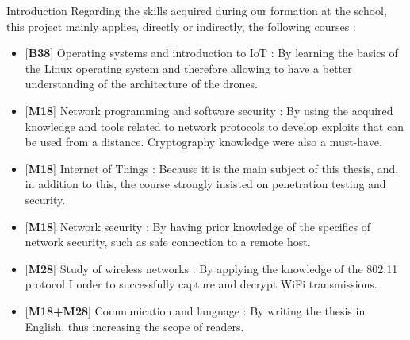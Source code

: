 \begin{chaptercover}{Introduction}
Regarding the skills acquired during our formation at the school, this project mainly applies, directly or indirectly, the following courses :
\begin{itemize}[itemsep=0.1cm,topsep=0.1cm]
  \hyphenation{}
  \item{} [{\color{FirstBlue}\bfseries B38}] Operating systems and introduction to IoT : By learning the basics of the Linux operating system and therefore allowing to have a better understanding of the architecture of the drones.
  \item{} [{\color{FirstBlue}\bfseries M18}] Network programming and software security : By using the acquired knowledge and tools related to network protocols to develop exploits that can be used from a distance. Cryptography knowledge were also a must-have.
  \item{} [{\color{FirstBlue}\bfseries M18}]  Internet of Things : Because it is the main subject of this thesis, and, in addition to this, the course strongly insisted on penetration testing and security.
  \item{} [{\color{FirstBlue}\bfseries M18}] Network security : By having prior knowledge of the specifics of network security, such as safe connection to a remote host.
  \item{} [{\color{FirstBlue}\bfseries M28}] Study of wireless networks : By applying the knowledge of the 802.11 protocol I order to successfully capture and decrypt WiFi transmissions.
  \item{} [{\color{FirstBlue}\bfseries M18+M28}] Communication and language : By writing the thesis in English, thus increasing the scope of readers.
\end{itemize}


\end{chaptercover}
